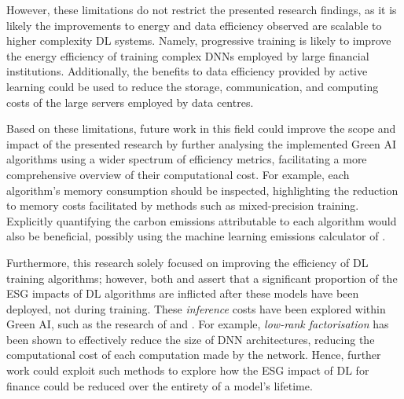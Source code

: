 \documentclass[a4paper, 11pt]{report}
\begin{document}
    However, these limitations do not restrict the presented research findings, as it is likely the improvements to energy and data efficiency observed are scalable to higher complexity DL systems. Namely, progressive training is likely to improve the energy efficiency of training complex DNNs employed by large financial institutions. Additionally, the benefits to data efficiency provided by active learning could be used to reduce the storage, communication, and computing costs of the large servers employed by data centres.

    Based on these limitations, future work in this field could improve the scope and impact of the presented research by further analysing the implemented Green AI algorithms using a wider spectrum of efficiency metrics, facilitating a more comprehensive overview of their computational cost. For example, each algorithm's memory consumption should be inspected, highlighting the reduction to memory costs facilitated by methods such as mixed-precision training. Explicitly quantifying the carbon emissions attributable to each algorithm would also be beneficial, possibly using the machine learning emissions calculator of \citet{lacoste-2019}.

    Furthermore, this research solely focused on improving the efficiency of DL training algorithms; however, both \citet{bender-2021} and \citet{xu-2021} assert that a significant proportion of the ESG impacts of DL algorithms are inflicted after these models have been deployed, not during training. These \emph{inference} costs have been explored within Green AI, such as the research of \citet{lacoste-2019} and \citet{cai-2022}. For example, \emph{low-rank factorisation} \citep{xu-2021} has been shown to effectively reduce the size of DNN architectures, reducing the computational cost of each computation made by the network. Hence, further work could exploit such methods to explore how the ESG impact of DL for finance could be reduced over the entirety of a model's lifetime.


    \newpage
    \footnotesize
    
\end{document}
